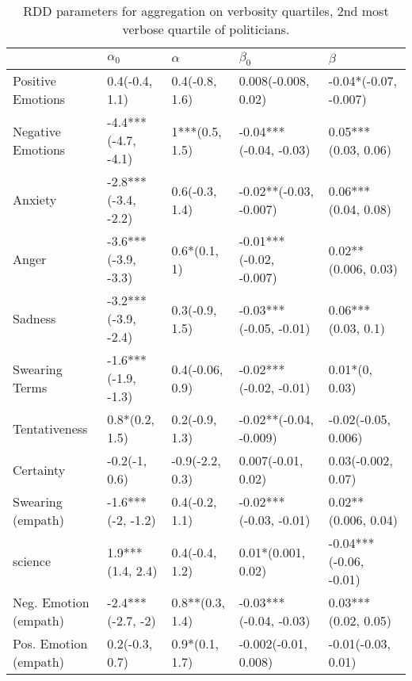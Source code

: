 \begin{table}[h]\centering
\caption{RDD parameters for aggregation on verbosity quartiles, 2nd most verbose quartile of politicians.}
	\label{fig: Verbosity_3}
\begin{adjustbox}{width=\linewidth, center}
	\begin{tabular}{lllll}
	\toprule
	{} &           $\alpha_0$ &         $\alpha$ &                $\beta_0$ &                 $\beta$ \\
	\midrule
	Positive Emotions     &       0.4(-0.4, 1.1) &   0.4(-0.8, 1.6) &      0.008(-0.008, 0.02) &   -0.04*(-0.07, -0.007) \\
	Negative Emotions     &  -4.4***(-4.7, -4.1) &   1***(0.5, 1.5) &   -0.04***(-0.04, -0.03) &     0.05***(0.03, 0.06) \\
	Anxiety               &  -2.8***(-3.4, -2.2) &   0.6(-0.3, 1.4) &   -0.02**(-0.03, -0.007) &     0.06***(0.04, 0.08) \\
	Anger                 &  -3.6***(-3.9, -3.3) &     0.6*(0.1, 1) &  -0.01***(-0.02, -0.007) &     0.02**(0.006, 0.03) \\
	Sadness               &  -3.2***(-3.9, -2.4) &   0.3(-0.9, 1.5) &   -0.03***(-0.05, -0.01) &      0.06***(0.03, 0.1) \\
	Swearing Terms        &  -1.6***(-1.9, -1.3) &  0.4(-0.06, 0.9) &   -0.02***(-0.02, -0.01) &          0.01*(0, 0.03) \\
	Tentativeness         &       0.8*(0.2, 1.5) &   0.2(-0.9, 1.3) &   -0.02**(-0.04, -0.009) &     -0.02(-0.05, 0.006) \\
	Certainty             &        -0.2(-1, 0.6) &  -0.9(-2.2, 0.3) &       0.007(-0.01, 0.02) &      0.03(-0.002, 0.07) \\
	Swearing (empath)     &    -1.6***(-2, -1.2) &   0.4(-0.2, 1.1) &   -0.02***(-0.03, -0.01) &     0.02**(0.006, 0.04) \\
	science               &     1.9***(1.4, 2.4) &   0.4(-0.4, 1.2) &       0.01*(0.001, 0.02) &  -0.04***(-0.06, -0.01) \\
	Neg. Emotion (empath) &    -2.4***(-2.7, -2) &  0.8**(0.3, 1.4) &   -0.03***(-0.04, -0.03) &     0.03***(0.02, 0.05) \\
	Pos. Emotion (empath) &       0.2(-0.3, 0.7) &   0.9*(0.1, 1.7) &     -0.002(-0.01, 0.008) &      -0.01(-0.03, 0.01) \\
	\bottomrule
	\end{tabular}
	
\end{adjustbox}
	\end{table}

